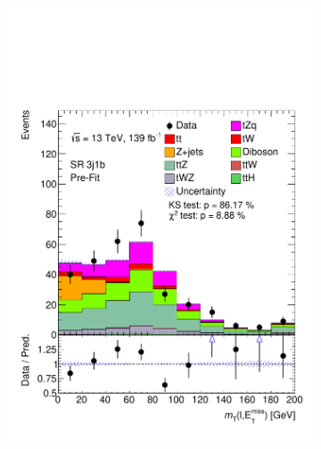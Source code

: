 \begin{figure}[!h]
\begin{subfigure}[b]{0.33\linewidth}
    \includegraphics[width=\linewidth]{ubonn-thesis/Chapters/Chapters_06/Figure/Input_distribution/SR_3j1b_mtW.pdf} 
  \end{subfigure} 
  \newline
  \vspace*{0.4cm}
  \begin{subfigure}[b]{0.33\linewidth}
    \centering

\end{subfigure}
\end{figure}
